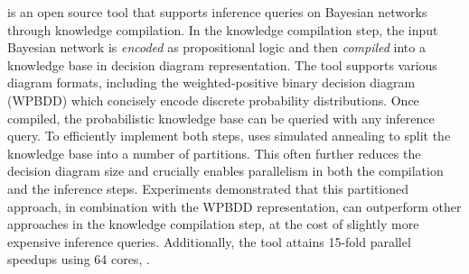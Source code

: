 
\toolname is an open source tool that supports inference queries on Bayesian networks through knowledge compilation. 
In the knowledge compilation step, the input Bayesian network is \emph{encoded} as propositional logic and then \emph{compiled} into a knowledge base in decision diagram representation. The tool supports various diagram formats, including the weighted-positive binary decision diagram (WPBDD) which concisely encode discrete probability distributions.
Once compiled, the probabilistic knowledge base can be queried with any inference query.
To efficiently implement both steps, \toolname uses simulated annealing to split the knowledge base into a number of partitions. This often further reduces the decision diagram size and crucially enables parallelism in both the compilation and the inference steps.
Experiments demonstrated that this partitioned approach, in combination with the WPBDD representation, can outperform other approaches in the knowledge compilation step, at the cost of slightly more expensive inference queries.
Additionally, the tool attains 15-fold parallel speedups using 64 cores, .





